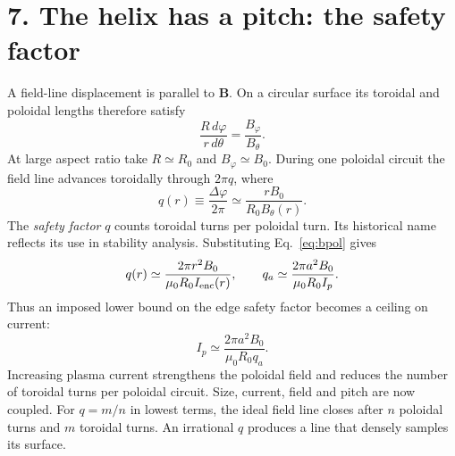 \documentclass[11pt]{article}
\begin{document}
\section*{7. The helix has a pitch: the safety factor}
A field-line displacement is parallel to $\mathbf B$. On a circular surface its
toroidal and poloidal lengths therefore satisfy
\begin{equation}
 \frac{R\,d\varphi}{r\,d\theta}=\frac{B_\varphi}{B_\theta}.
 \label{eq:pitch}
\end{equation}
At large aspect ratio take $R\simeq R_0$ and $B_\varphi\simeq B_0$. During one
poloidal circuit the field line advances toroidally through $2\pi q$, where
\begin{equation}
 q(r)\equiv\frac{\Delta\varphi}{2\pi}\simeq\frac{rB_0}{R_0B_\theta(r)}.
 \label{eq:qdef}
\end{equation}
The \emph{safety factor} $q$ counts toroidal turns per poloidal turn. Its historical
name reflects its use in stability analysis. Substituting Eq.~\eqref{eq:bpol} gives
\begin{equation}
 q(r)\simeq\frac{2\pi r^2B_0}{\mu_0R_0I_{\rm enc}(r)},\qquad
 q_a\simeq\frac{2\pi a^2B_0}{\mu_0R_0I_p}.
 \label{eq:qedge}
\end{equation}
Thus an imposed lower bound on the edge safety factor becomes a ceiling on current:
\begin{equation}
 I_p\simeq\frac{2\pi a^2B_0}{\mu_0R_0q_a}.
 \label{eq:ipq}
\end{equation}
Increasing plasma current strengthens the poloidal field and reduces the number of
toroidal turns per poloidal circuit. Size, current, field and pitch are now coupled.
For $q=m/n$ in lowest terms, the ideal field line closes after $n$ poloidal turns and
$m$ toroidal turns. An irrational $q$ produces a line that densely samples its surface.

\end{document}
